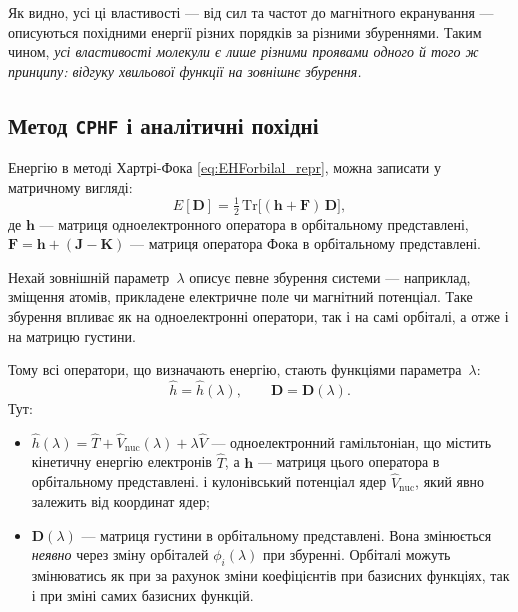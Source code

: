 Як видно, усі ці властивості --- від сил та частот до магнітного екранування ---
описуються похідними енергії різних порядків за різними збуреннями.
Таким чином, \emph{усі властивості молекули є лише різними проявами одного й того ж принципу: відгуку хвильової функції на зовнішнє збурення.}

\subsection{Метод \texttt{CPHF} і аналітичні похідні}


Енергію в методі Хартрі-Фока \eqref{eq:EHForbilal_repr}, можна записати у матричному вигляді:
\begin{equation*}
E[\mathbf D]
= \tfrac{1}{2}\,\mathrm{Tr}\!\big[(\mathbf h + \mathbf F)\,\mathbf D\big],
\end{equation*}
де \(\mathbf h\) --- матриця одноелектронного оператора в орбітальному представлені, \( \mathbf F = \mathbf h + (\mathbf J - \mathbf K) \) --- матриця оператора Фока в орбітальному представлені.


Нехай зовнішній параметр~$\lambda$ описує певне збурення системи —
наприклад, зміщення атомів, прикладене електричне поле чи магнітний потенціал.
Таке збурення впливає як на одноелектронні оператори, так і на самі орбіталі, а отже і на матрицю густини.

Тому всі оператори, що визначають енергію, стають функціями параметра~$\lambda$:
\[
\hat h = \hat h(\lambda), \qquad
\mathbf D = \mathbf D(\lambda).
\]
Тут:
\begin{itemize}
  \item $\hat h(\lambda) = \hat T + \hat V_\text{nuc}(\lambda) + \lambda \hat{V}$ --- одноелектронний гамільтоніан,
  що містить кінетичну енергію електронів $\hat T$, а $\mathbf h$ --- матриця цього оператора в орбітальному представлені.
  і кулонівський потенціал ядер $\hat V_\text{nuc}$, який явно залежить від координат ядер;
  \item $\mathbf D(\lambda)$ --- матриця густини в орбітальному представлені. Вона
  змінюється \emph{неявно} через зміну орбіталей $\phi_i(\lambda)$ при збуренні. Орбіталі можуть змінюватись як при за рахунок зміни коефіцієнтів при базисних функціях, так і при зміні самих базисних функцій.
\end{itemize}



